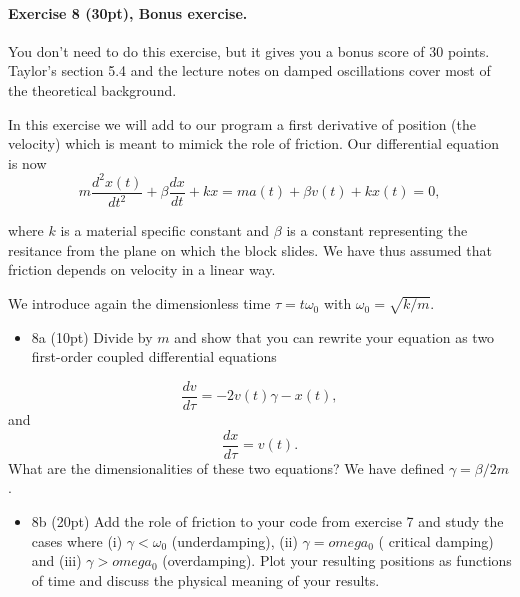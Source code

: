 \documentclass[%
oneside,                 %
final,                   %
10pt]{article}
\begin{document}
\paragraph{Exercise 8 (30pt), Bonus exercise.}
You don't need to do this exercise, but it gives you a bonus score of 30 points. Taylor's section 5.4 and the lecture notes on damped oscillations cover most of the theoretical background.

In this exercise we will add to our program a first derivative of position (the velocity) which is meant to mimick the role of friction.
Our differential equation is now
\[
m\frac{d^2x(t)}{dt^2}+\beta\frac{dx}{dt}+kx=ma(t)+\beta v(t)+kx(t)=0,
\]

where $k$ is a material specific constant and $\beta$ is a constant
representing the resitance from the plane on which the block slides.
We have thus assumed that friction depends on velocity in a linear
way.

We introduce again the dimensionless time $\tau = t\omega_0$ with
$\omega_0=\sqrt{k/m}$.

\begin{itemize}
\item 8a (10pt) Divide by $m$ and show that you can rewrite your equation as two first-order coupled differential equations
\end{itemize}

\noindent
\[
\frac{dv}{d\tau} = -2v(t)\gamma-x(t),
\]
and
\[
\frac{dx}{d\tau} = v(t).
\]
What are the dimensionalities of these two equations? We have defined $\gamma = \beta/2m$.  


\begin{itemize}
\item 8b (20pt)  Add the role of friction to your code from exercise 7 and study the cases where (i) $\gamma < \omega_0$ (underdamping), (ii) $\gamma = omega_0$ ( critical damping) and (iii) $\gamma > omega_0$ (overdamping). Plot your resulting positions as functions of time and discuss the physical meaning of your results.
\end{itemize}

\noindent


\end{document}
